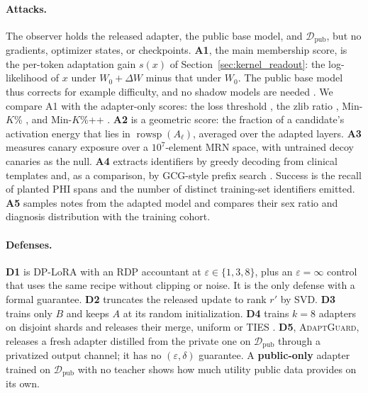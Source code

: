 \documentclass[11pt]{article}
\newcommand{\Wz}{W_0}
\newcommand{\dW}{\Delta W}
\newcommand{\D}{\mathcal{D}}
\newcommand{\rowsp}{\operatorname{rowsp}}
\theoremstyle{plain}
\theoremstyle{definition}
\begin{document}
\paragraph{Attacks.}
The observer holds the released adapter, the public base model, and $\D_{\text{pub}}$, but no gradients, optimizer states, or checkpoints.
\textbf{A1}, the main membership score, is the per-token adaptation gain $s(x)$ of Section~\ref{sec:kernel_readout}: the log-likelihood of $x$ under $\Wz+\dW$ minus that under $\Wz$.
The public base model thus corrects for example difficulty, and no shadow models are needed \citep{carlini2022lira,duan2024mia,ran2025loraleak}.
We compare A1 with the adapter-only scores: the loss threshold \citep{yeom2018privacy}, the zlib ratio \citep{carlini2021extracting}, Min-$K$\% \citep{shi2024detecting}, and Min-$K$\%++ \citep{zhang2024minkpp}.
\textbf{A2} is a geometric score: the fraction of a candidate's activation energy that lies in $\rowsp(A_\ell)$, averaged over the adapted layers.
\textbf{A3} measures canary exposure \citep{carlini2019secret} over a $10^7$-element MRN space, with untrained decoy canaries as the null.
\textbf{A4} extracts identifiers by greedy decoding from clinical templates and, as a comparison, by GCG-style prefix search \citep{zou2023gcg}. Success is the recall of planted PHI spans and the number of distinct training-set identifiers emitted.
\textbf{A5} samples notes from the adapted model and compares their sex ratio and diagnosis distribution with the training cohort.

\paragraph{Defenses.}
\textbf{D1} is DP-LoRA \citep{abadi2016dpsgd,yu2022dpft} with an RDP accountant \citep{mironov2019rdp} at $\varepsilon\in\{1,3,8\}$, plus an $\varepsilon{=}\infty$ control that uses the same recipe without clipping or noise. It is the only defense with a formal guarantee.
\textbf{D2} truncates the released update to rank $r'$ by SVD.
\textbf{D3} trains only $B$ and keeps $A$ at its random initialization.
\textbf{D4} trains $k{=}8$ adapters on disjoint shards and releases their merge, uniform or TIES \citep{yadav2023ties}.
\textbf{D5}, \textsc{AdaptGuard}, releases a fresh adapter distilled from the private one on $\D_{\text{pub}}$ through a privatized output channel; it has no $(\varepsilon,\delta)$ guarantee.
A \textbf{public-only} adapter trained on $\D_{\text{pub}}$ with no teacher shows how much utility public data provides on its own.
\end{document}
